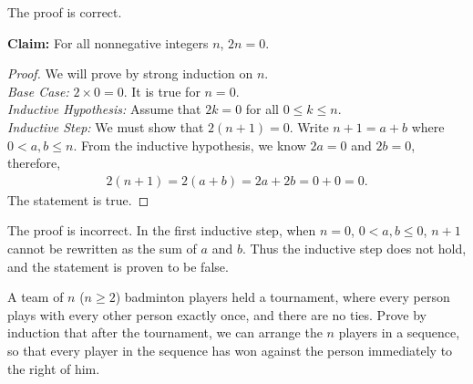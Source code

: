 \documentclass[11pt]{article}
\begin{document}
\begin{Parts}
	\begin{Answer}
		The proof is correct. 
	\end{Answer}

	\Part
		\textbf{Claim:} For all nonnegative integers $n$, $2n=0$.
		\begin{proof}
			We will prove by strong induction on $n$.	\\
			\emph{Base Case:} $2 \times 0 = 0$. It is true for $n=0$.	\\
			\emph{Inductive Hypothesis:} Assume that $2k=0$ for all $0 \le k \le n$.	\\
			\emph{Inductive Step:} We must show that $2(n+1)=0$. Write $n+1 = a+b$ where $0 < a,b \le n$.
			From the inductive hypothesis, we know $2a = 0$ and $2b=0$, therefore,
			\begin{align*}
				2(n+1) = 2(a+b) = 2a + 2b = 0+0 =0.
			\end{align*}
			The statement is true.
		\end{proof}

	\begin{Answer}
		The proof is incorrect. In the first inductive step, when $n=0$, $0<a,b\leq 0$, $n+1$ cannot be rewritten as 
		the sum of $a$ and $b$. Thus the inductive step does not hold, and the statement is proven to be false. 
	\end{Answer}
\end{Parts}

\newpage
{}

A team of $n$ ($n \geq 2$) badminton players held a tournament, where every person plays with every other person exactly 
once, and there are no ties. Prove by induction that after the tournament, we can arrange the $n$ players in a sequence, 
so that every player in the sequence has won against the person immediately to the right of him.
\end{document}
